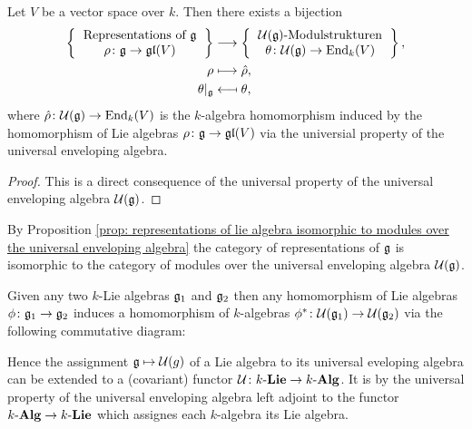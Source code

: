 \begin{prop}\label{prop: representations of lie algebra isomorphic to modules over the universal enveloping algebra}
 Let $V$ be a vector space over $k$. Then there exists a bijection
 \begin{align*}
  \left\{
   \begin{tabular}{c}
    Representations of $\g$ \\
    $\rho \colon \g \to \gl(V)$
   \end{tabular}
  \right\}
  &\longrightarrow
  \left\{
   \begin{tabular}{c}
    $\Ue(\g)$-Modulstrukturen \\
    $\theta \colon \Ue(\g) \to \End_k(V)$
   \end{tabular}
  \right\}, \\
          \rho &\longmapsto   \hat{\rho}, \\
  \theta|_{\g} &\longmapsfrom \theta,
 \end{align*}
 where $\hat{\rho} \colon \mathcal{U}(\mathfrak{g}) \to \operatorname{End}_k(V)$ is the $k$-algebra homomorphism induced by the homomorphism of Lie algebras $\rho \colon \mathfrak{g} \to \mathfrak{gl}(V)$ via the universial property of the universal enveloping algebra.
\end{prop}
\begin{proof}
 This is a direct consequence of the universal property of the universal enveloping algebra $\mathcal{U}(\mathfrak{g})$.
\end{proof}


\begin{rem}
 By Proposition \ref{prop: representations of lie algebra isomorphic to modules over the universal enveloping algebra} the category of representations of $\mathfrak{g}$ is isomorphic to the category of modules over the universal enveloping algebra $\mathcal{U}(\mathfrak{g})$.
\end{rem}


\begin{rem}
 Given any two $k$-Lie algebras $\mathfrak{g}_1$ and $\mathfrak{g}_2$ then any homomorphism of Lie algebras $\phi \colon \mathfrak{g}_1 \to \mathfrak{g}_2$ induces a homomorphism of $k$-algebras $\phi^* \colon \mathcal{U}(\mathfrak{g}_1) \to \mathcal{U}(\mathfrak{g}_2)$ via the following commutative diagram:
 \begin{center}
 \end{center}
 Hence the assignment $\mathfrak{g} \mapsto \mathcal{U}(g)$ of a Lie algebra to its universal eveloping algebra can be extended to a (covariant) functor $\mathcal{U} \colon k\text{-}\mathbf{Lie} \to k\text{-}\mathbf{Alg}$. It is by the universal property of the universal enveloping algebra left adjoint to the functor $k\text{-}\mathbf{Alg} \to k\text{-}\mathbf{Lie}$ which assignes each $k$-algebra its Lie algebra.
\end{rem}



